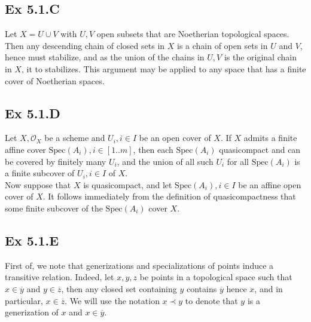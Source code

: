 \documentclass{article}
\theoremstyle{definition}
\newcommand{\Spec}{\text{Spec}}
\begin{document}
\subsection*{Ex 5.1.C}

Let $X = U \cup V$ with $U, V$ open subsets that are Noetherian topological
spaces. Then any descending chain of closed sets in $X$ is a chain of open sets
in $U$ and $V$, hence must stabilize, and as the union of the chains in $U, V$
is the original chain in $X$, it to stabilizes. This argument may be applied to
any space that has a finite cover of Noetherian spaces.

\subsection*{Ex 5.1.D}

Let $X, \mathcal{O}_X$ be a scheme and $U_i, i \in I$ be an open cover of $X$.
If $X$ admits a finite affine cover $\Spec(A_i), i \in [1..m]$, then each
$\Spec(A_i)$ quasicompact and can be covered by finitely many $U_i$, and the
union of all such $U_i$ for all $\Spec(A_i)$ is a finite subcover of $U_i,i \in
I$ of $X$. \\

Now suppose that $X$ is quasicompact, and let $\Spec(A_i), i \in I$ be an
affine open cover of $X$. It follows immediately from the definition of
quasicompactness that some finite subcover of the $\Spec(A_i)$ cover $X$.

\subsection*{Ex 5.1.E}

First of, we note that generizations and specializations of points induce a
transitive relation. Indeed, let $x, y, z$ be points in a topological space
such that $x \in \overline{y}$ and $y \in \overline{z}$, then any closed set
containing $y$ contains $\overline{y}$ hence $x$, and in particular, $x \in
\overline{z}$. We will use the notation $x \prec y$ to denote that $y$ is a
generization of $x$ and $x \in \overline{y}$.\\
\end{document}
